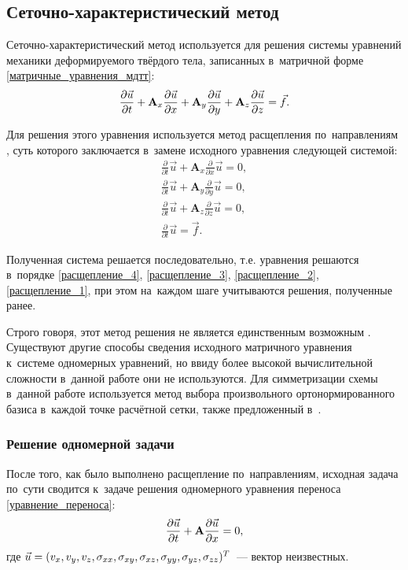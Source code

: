 \documentclass[thesis.tex]{subfiles}
\begin{document}
\subsection{Сеточно-характеристический метод}

Сеточно-характеристический \cite{магомедов1988схм} метод используется для решения системы уравнений механики деформируемого
твёрдого тела, записанных в~матричной форме \eqref{матричные_уравнения_мдтт}:
\[
    \frac{\partial{\vec u}}{\partial{t}} + \mathbf A_x \frac{\partial{\vec u}}{\partial{x}} +
                   \mathbf A_y \frac{\partial{\vec u}}{\partial{y}} +
                   \mathbf A_z \frac{\partial{\vec u}}{\partial{z}} = \vec f.
\]

Для решения этого уравнения используется метод расщепления по~направлениям \cite{федоренко528введение}, суть которого
заключается в~замене исходного уравнения следующей системой:
\begin{align}
    \frac{\partial}{\partial t}\vec u+\mathbf{A}_x \frac{\partial}{\partial x}\vec u = 0, \label{расщепление_1} \\
    \frac{\partial}{\partial t}\vec u+\mathbf{A}_y \frac{\partial}{\partial y}\vec u = 0, \label{расщепление_2} \\
    \frac{\partial}{\partial t}\vec u+\mathbf{A}_z \frac{\partial}{\partial z}\vec u = 0, \label{расщепление_3} \\
    \frac{\partial}{\partial t}\vec u = \vec f. \label{расщепление_4}
\end{align}

Полученная система решается последовательно, т.е. уравнения решаются в~порядке \eqref{расщепление_4}, \eqref{расщепление_3},
\eqref{расщепление_2}, \eqref{расщепление_1}, при этом на~каждом шаге учитываются решения, полученные ранее.

Строго говоря, этот метод решения не является единственным возможным \cite{челноков2005диссертация}. Существуют другие
способы сведения исходного матричного уравнения к~системе одномерных уравнений, но ввиду более высокой вычислительной
сложности в~данной работе они не используются. Для симметризации схемы в~данной работе используется метод выбора
произвольного ортонормированного базиса в~каждой точке расчётной сетки, также предложенный в~\cite{челноков2005диссертация}.


\subsubsection{Решение одномерной задачи}
После того, как было выполнено расщепление по~направлениям, исходная задача по~сути сводится к~задаче решения одномерного
уравнения переноса \eqref{уравнение_переноса}: \newpage
\begin{equation}
    \frac{\partial{\vec u}}{\partial{t}} + \mathbf A \frac{\partial{\vec u}}{\partial{x}} = 0,
    \label{уравнение_переноса}
\end{equation}
где $\vec u = (v_x,v_y,v_z,\sigma_{xx},\sigma_{xy},\sigma_{xz},\sigma_{yy},\sigma_{yz},\sigma_{zz})^T$~--- вектор неизвестных.
\end{document}

